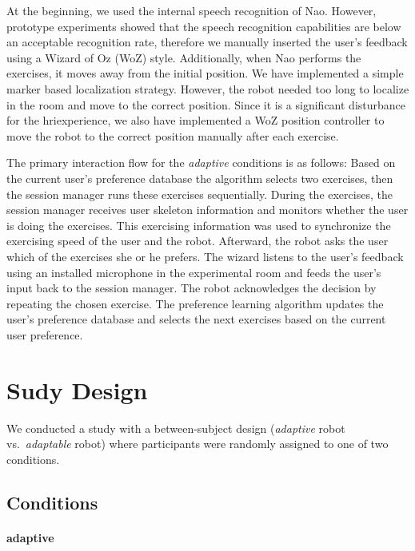 \documentclass[twocolumn]{svjour3}          %
\begin{document}
At the beginning, we used the internal speech recognition of Nao.
However, prototype experiments showed that the speech recognition
capabilities are below an acceptable recognition rate, therefore we
manually inserted the user's feedback using a Wizard of Oz (WoZ) style.
Additionally, when Nao performs the exercises, it moves away from the
initial position. We have implemented a simple marker based localization
strategy. However, the robot needed too long to localize in the room and
move to the correct position. Since it is a significant disturbance for
the \gls{hri}experience, we also have implemented a WoZ position controller
to move the robot to the correct position manually after each exercise.

The primary interaction flow for the \textit{adaptive} conditions is as follows:
Based on the current user's preference database the algorithm selects
two exercises, then the session manager runs these exercises
sequentially. During the exercises, the session manager receives user
skeleton information and monitors whether the user is doing the
exercises. This exercising information was used to synchronize the
exercising speed of the user and the robot. Afterward, the robot asks
the user which of the exercises she or he prefers. The wizard listens to
the user's feedback using an installed microphone in the experimental
room and feeds the user's input back to the session manager. The robot
acknowledges the decision by repeating the chosen exercise. The
preference learning algorithm updates the user's preference database and
selects the next exercises based on the current user preference.

\hypertarget{sudy-design}{%
\section{\texorpdfstring{Sudy Design
\label{adaptation:sec:study}}{Sudy Design }}\label{sudy-design}}

We conducted a study with a between-subject design (\textit{adaptive} robot
vs.~\textit{adaptable} robot) where participants were randomly assigned to one of
two conditions.

\hypertarget{conditions}{%
\subsection{Conditions}\label{conditions}}

\hypertarget{adaptivity}{%
\paragraph{adaptive}\label{adaptivity}}
\end{document}
